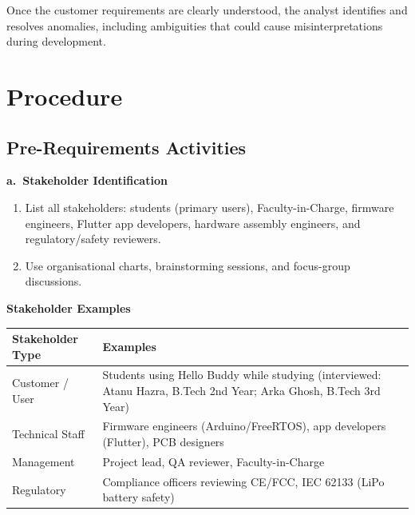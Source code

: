 \documentclass[12pt,a4paper]{article}
\begin{document}
Once the customer requirements are clearly understood, the analyst identifies and
resolves anomalies, including ambiguities that could cause misinterpretations during
development.

\newpage
\section*{Procedure}

\subsection*{Pre-Requirements Activities}

\textbf{a.\ Stakeholder Identification}

\begin{enumerate}[leftmargin=*]
\item List all stakeholders: students (primary users), Faculty-in-Charge,
      firmware engineers, Flutter app developers, hardware assembly
      engineers, and regulatory/safety reviewers.
\item Use organisational charts, brainstorming sessions, and focus-group
      discussions.
\end{enumerate}

\vspace{0.3cm}

\textbf{Stakeholder Examples}

\begin{center}
\begin{tabular}{|L{0.28\textwidth}|L{0.58\textwidth}|}
\hline
\textbf{Stakeholder Type} & \textbf{Examples} \\ \hline
Customer / User & Students using Hello Buddy while studying
                  (interviewed: Atanu Hazra, B.Tech 2nd Year;
                  Arka Ghosh, B.Tech 3rd Year) \\ \hline
Technical Staff & Firmware engineers (Arduino/FreeRTOS), app
                  developers (Flutter), PCB designers \\ \hline
Management & Project lead, QA reviewer, Faculty-in-Charge \\ \hline
Regulatory & Compliance officers reviewing CE/FCC,
             IEC 62133 (LiPo battery safety) \\ \hline
\end{tabular}
\end{center}
\end{document}
